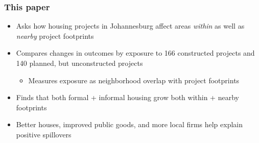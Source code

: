 \documentclass[aspectratio=32]{beamer}
\begin{document}




\begin{frame}
\frametitle{This paper}
\centering

\begin{itemize}
    \item Asks how housing projects in Johannesburg affect areas \textit{within} as well as \textit{nearby} project footprints
  \vspace{2mm}
  \item Compares changes in outcomes by exposure to 166 constructed projects and 140 planned, but unconstructed projects
  \begin{itemize}
    \item Measures exposure as neighborhood overlap with project footprints
  \end{itemize}
  \vspace{2mm}

  \item Finds that both formal + informal housing grow both within + nearby footprints
  \vspace{2mm}

  \item Better houses, improved public goods, and more local firms help explain positive spillovers
   
\end{itemize}


\end{frame}


\end{document}
